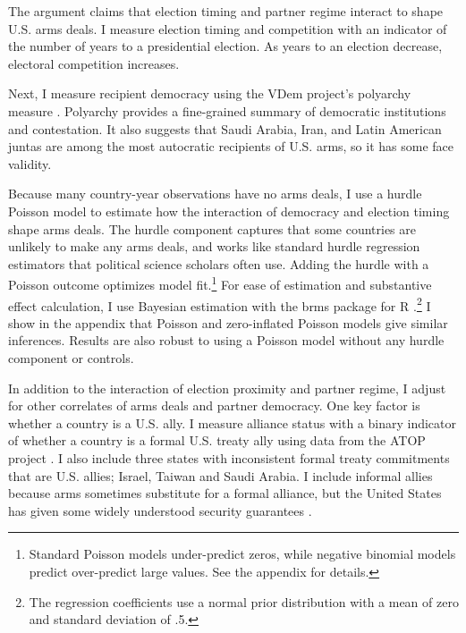 \documentclass[12pt]{article}
\begin{document}
The argument claims that election timing and partner regime interact to shape U.S. arms deals. 
I measure election timing and competition with an indicator of the number of years to a presidential election. 
As years to an election decrease, electoral competition increases. 


Next, I measure recipient democracy using the VDem project's polyarchy measure \citep{Coppedgeetal2008}. 
Polyarchy provides a fine-grained summary of democratic institutions and contestation.
It also suggests that Saudi Arabia, Iran, and Latin American juntas are among the most autocratic recipients of U.S. arms, so it has some face validity.  


Because many country-year observations have no arms deals, I use a hurdle Poisson model to estimate how the interaction of democracy and election timing shape arms deals.
The hurdle component captures that some countries are unlikely to make any arms deals, and works like standard hurdle regression estimators that political science scholars often use. 
Adding the hurdle with a Poisson outcome optimizes model fit.\footnote{Standard Poisson models under-predict zeros, while negative binomial models predict over-predict large values. See the appendix for details.} 
For ease of estimation and substantive effect calculation, I use Bayesian estimation with the brms package for \textsf{R} \citep{Buerkner2017}.\footnote{The regression coefficients use a normal prior distribution with a mean of zero and standard deviation of .5.}
I show in the appendix that Poisson and zero-inflated Poisson models give similar inferences. 
Results are also robust to using a Poisson model without any hurdle component or controls.


In addition to the interaction of election proximity and partner regime, I adjust for other correlates of arms deals and partner democracy. 
One key factor is whether a country is a U.S. ally. 
I measure alliance status with a binary indicator of whether a country is a formal U.S. treaty ally using data from the ATOP project \citep{Leedsetal2002}.
I also include three states with inconsistent formal treaty commitments that are U.S. allies; Israel, Taiwan and Saudi Arabia. 
I include informal allies because arms sometimes substitute for a formal alliance, but the United States has given some widely understood security guarantees \citep{Yarhi-Miloetal2016}. 
\end{document}
